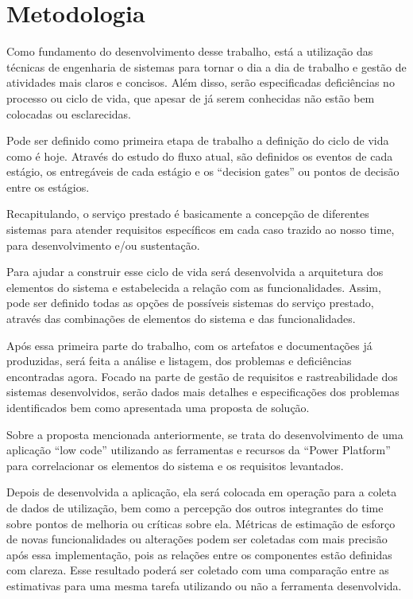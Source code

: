 
\chapter{Metodologia}\label{chap:metodologia}

Como fundamento do desenvolvimento desse trabalho, está a utilização das 
técnicas de engenharia de sistemas para tornar o dia a dia de trabalho e gestão de 
atividades mais claros e concisos. Além disso, serão especificadas deficiências no 
processo ou ciclo de vida, que apesar de já serem conhecidas não estão bem 
colocadas ou esclarecidas. 

Pode ser definido como primeira etapa de trabalho a definição do ciclo de vida como 
é hoje. Através do estudo do fluxo atual, são definidos os eventos de cada estágio, 
os entregáveis de cada estágio e os “decision gates” ou pontos de decisão entre os 
estágios. 

Recapitulando, o serviço prestado é basicamente a concepção de diferentes 
sistemas para atender requisitos específicos em cada caso trazido ao nosso time, 
para desenvolvimento e/ou sustentação.   

Para ajudar a construir esse ciclo de vida será desenvolvida a arquitetura dos 
elementos do sistema e estabelecida a relação com as funcionalidades. Assim, pode 
ser definido todas as opções de possíveis sistemas do serviço prestado, através das 
combinações de elementos do sistema e das funcionalidades. 

Após essa primeira parte do trabalho, com os artefatos e documentações já 
produzidas, será feita a análise e listagem, dos problemas e deficiências 
encontradas agora. Focado na parte de gestão de requisitos e rastreabilidade dos 
sistemas desenvolvidos, serão dados mais detalhes e especificações dos problemas 
identificados bem como apresentada uma proposta de solução. 

Sobre a proposta mencionada anteriormente, se trata do desenvolvimento de uma 
aplicação “low code” utilizando as ferramentas e recursos da “Power Platform” para 
correlacionar os elementos do sistema e os requisitos levantados. 

Depois de desenvolvida a aplicação, ela será colocada em operação para a coleta 
de dados de utilização, bem como a percepção dos outros integrantes do time sobre 
pontos de melhoria ou críticas sobre ela. Métricas de estimação de esforço de novas 
funcionalidades ou alterações podem ser coletadas com mais precisão após essa 
implementação, pois as relações entre os componentes estão definidas com 
clareza. Esse resultado poderá ser coletado com uma comparação entre as 
estimativas para uma mesma tarefa utilizando ou não a ferramenta desenvolvida. 

